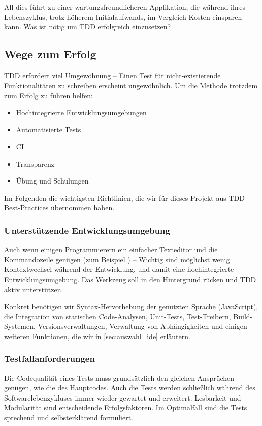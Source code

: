 All dies führt zu einer wartungsfreundlicheren Applikation, die während ihres Lebenszyklus, trotz höherem Initialaufwands, im Vergleich Kosten einsparen kann. Was ist nötig um \ac{TDD} erfolgreich einzusetzen?

\subsection{Wege zum Erfolg}
\ac{TDD} erfordert viel Umgewöhnung -- Einen Test für nicht-existierende Funktionalitäten zu schreiben erscheint ungewöhnlich. Um die Methode trotzdem zum Erfolg zu führen helfen:

\begin{itemize}
	\item Hochintegrierte Entwicklungsumgebungen
	\item Automatisierte Tests
	\item \ac{CI}
	\item Transparenz
	\item Übung und Schulungen
\end{itemize}
%
Im Folgenden die wichtigsten Richtlinien, die wir für dieses Projekt aus \ac{TDD}-Best-Practices \cite[S.\ 99]{Seidl2012} übernommen haben.

\subsubsection{Unterstützende Entwicklungsumgebung}
Auch wenn einigen Programmierern  ein einfacher Texteditor und die Kommandozeile genügen (zum Beispiel \cite{Roden2015}) -- Wichtig sind möglichst wenig Kontextwechsel während der Entwicklung, und damit eine hochintegrierte Entwicklungsumgebung. Das Werkzeug soll in den Hintergrund rücken und \ac{TDD} aktiv unterstützen.

Konkret benötigen wir Syntax-Hervorhebung der genutzten Sprache (JavaScript), die Integration von statischen Code-Analysen, Unit-Tests, Test-Treibern, Build-Systemen, Versionsverwaltungen, Verwaltung von Abhängigkeiten und einigen weiteren Funktionen, die wir in \autoref{sec:auswahl_ide} erläutern.

\subsubsection{Testfallanforderungen}
Die Codequalität eines Tests muss grundsätzlich den gleichen Ansprüchen genügen, wie die des Hauptcodes. Auch die Tests werden schließlich während des Softwarelebenzykluses immer wieder gewartet und erweitert. Lesbarkeit und Modularität sind entscheidende Erfolgsfaktoren. Im Optimalfall sind die Tests sprechend und selbsterklärend formuliert.

